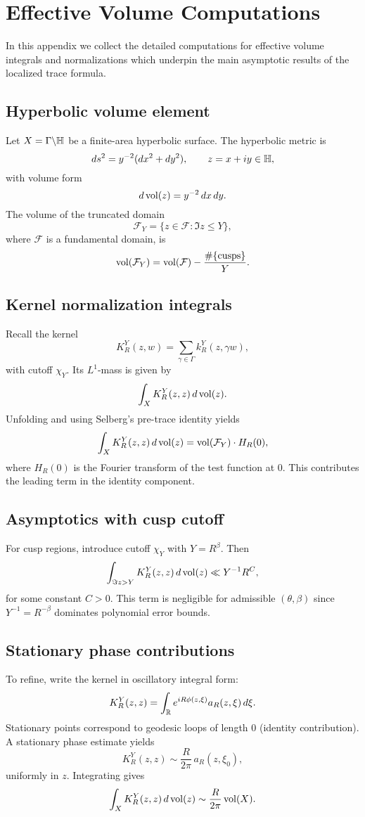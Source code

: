 \appendix
\section{Effective Volume Computations}
\label{app:effvol}

In this appendix we collect the detailed computations for effective
volume integrals and normalizations which underpin the main
asymptotic results of the localized trace formula.

\subsection{Hyperbolic volume element}
Let $X = \Gamma \backslash \mathbb{H}$ be a finite-area hyperbolic surface.
The hyperbolic metric is
\[
ds^2 = y^{-2}(dx^2 + dy^2), \qquad z = x + iy \in \mathbb{H},
\]
with volume form
\[
d\operatorname{vol}(z) = y^{-2}\,dx\,dy.
\]
The volume of the truncated domain
\[
\mathcal{F}_Y = \{ z \in \mathcal{F} : \Im z \le Y \},
\]
where $\mathcal{F}$ is a fundamental domain, is
\[
\operatorname{vol}(\mathcal{F}_Y) = \operatorname{vol}(\mathcal{F}) - \frac{\#\{\text{cusps}\}}{Y}.
\]

\subsection{Kernel normalization integrals}
Recall the kernel
\[
K_R^Y(z,w) = \sum_{\gamma \in \Gamma} k_R^Y(z,\gamma w),
\]
with cutoff $\chi_Y$. Its $L^1$-mass is given by
\[
\int_X K_R^Y(z,z)\,d\operatorname{vol}(z).
\]
Unfolding and using Selberg’s pre-trace identity yields
\[
\int_X K_R^Y(z,z)\,d\operatorname{vol}(z) = \operatorname{vol}(\mathcal{F}_Y) \cdot H_R(0),
\]
where $H_R(0)$ is the Fourier transform of the test function at $0$.
This contributes the leading term in the identity component.

\subsection{Asymptotics with cusp cutoff}
For cusp regions, introduce cutoff $\chi_Y$ with $Y = R^\beta$. Then
\[
\int_{\Im z > Y} K_R^Y(z,z)\,d\operatorname{vol}(z) \ll Y^{-1} R^C,
\]
for some constant $C>0$. This term is negligible for admissible $(\theta,\beta)$
since $Y^{-1} = R^{-\beta}$ dominates polynomial error bounds.

\subsection{Stationary phase contributions}
To refine, write the kernel in oscillatory integral form:
\[
K_R^Y(z,z) = \int_{\mathbb{R}} e^{iR\phi(z,\xi)} a_R(z,\xi)\,d\xi.
\]
Stationary points correspond to geodesic loops of length $0$ (identity contribution).
A stationary phase estimate yields
\[
K_R^Y(z,z) \sim \frac{R}{2\pi}\,a_R(z,\xi_0),
\]
uniformly in $z$. Integrating gives
\[
\int_X K_R^Y(z,z)\,d\operatorname{vol}(z) \sim \frac{R}{2\pi}\operatorname{vol}(X).
\]

